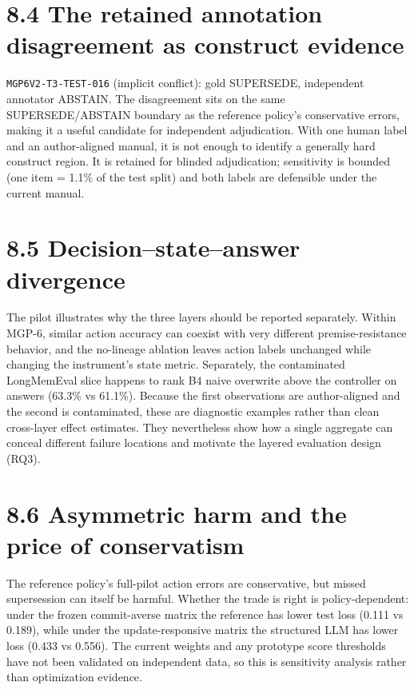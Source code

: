 \section{8.4 The retained annotation disagreement as construct
evidence}\label{the-retained-annotation-disagreement-as-construct-evidence}

\texttt{MGP6V2-T3-TEST-016} (implicit conflict): gold SUPERSEDE,
independent annotator ABSTAIN. The disagreement sits on the same
SUPERSEDE/ABSTAIN boundary as the reference policy's conservative
errors, making it a useful candidate for independent adjudication. With
one human label and an author-aligned manual, it is not enough to
identify a generally hard construct region. It is retained for blinded
adjudication; sensitivity is bounded (one item = 1.1\% of the test
split) and both labels are defensible under the current manual.

\section{8.5 Decision--state--answer
divergence}\label{decisionstateanswer-divergence}

The pilot illustrates why the three layers should be reported
separately. Within MGP-6, similar action accuracy can coexist with very
different premise-resistance behavior, and the no-lineage ablation
leaves action labels unchanged while changing the instrument's state
metric. Separately, the contaminated LongMemEval slice happens to rank
B4 naive overwrite above the controller on answers (63.3\% vs 61.1\%).
Because the first observations are author-aligned and the second is
contaminated, these are diagnostic examples rather than clean
cross-layer effect estimates. They nevertheless show how a single
aggregate can conceal different failure locations and motivate the
layered evaluation design (RQ3).

\section{8.6 Asymmetric harm and the price of
conservatism}\label{asymmetric-harm-and-the-price-of-conservatism}

The reference policy's full-pilot action errors are conservative, but
missed supersession can itself be harmful. Whether the trade is right is
policy-dependent: under the frozen commit-averse matrix the reference
has lower test loss (0.111 vs 0.189), while under the update-responsive
matrix the structured LLM has lower loss (0.433 vs 0.556). The current
weights and any prototype score thresholds have not been validated on
independent data, so this is sensitivity analysis rather than
optimization evidence.

